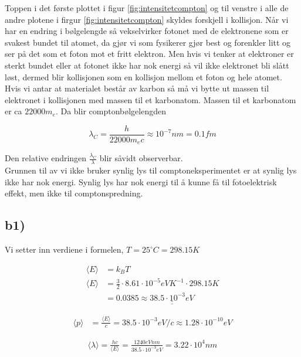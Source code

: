 \documentclass[norsk,a4paper,12pt]{article}
\begin{document}
Toppen i det første plottet i figur \ref{fig:intensitetcompton} og  til venstre i alle de andre plotene i firgur \ref{fig:intensitetcompton}  skyldes forskjell i kollisjon. Når vi har en endring i bølgelengde så vekselvirker fotonet med de elektronene som er svakest bundet til atomet, da gjør vi som fysikerer gjør best og forenkler litt og ser på det som et foton mot et fritt elektron. Men hvis vi tenker at elektroner er sterkt bundet eller at fotonet ikke har nok energi så vil ikke elektronet bli slått løst, dermed blir kollisjonen som en kollisjon mellom et foton og hele atomet. Hvis vi antar at materialet består av karbon så må vi bytte ut massen til elektronet i kollisjonen med massen til et karbonatom. Massen til et karbonatom er ca $22000m_e$. Da blir comptonbølgelengden 

\begin{equation}
\lambda_C = \frac{h}{22000m_ec} \approx 10^{-7} nm = 0.1fm
\end{equation}

Den relative endringen $\frac{\lambda_C}{\lambda}$ blir såvidt observerbar. 
\\

Grunnen til av vi ikke bruker synlig lys til comptoneksperimentet er at synlig lys ikke har nok energi. Synlig lys har nok energi til å kunne få til fotoelektrisk effekt, men ikke til comptonspredning.


\subsection*{b1)}

Vi setter inn verdiene i formelen, $T=25^\circ C = 298.15K$

\begin{align*}
\langle E \rangle &= k_BT\\
\langle E \rangle &= \frac{3}{2} \cdot 8.61 \cdot 10^{-5}  eVK^{-1} \cdot 298.15 K\\
&= 0.0385 \approx \underline{\underline{ 38.5 \cdot10^{-3} eV}}
\end{align*}


\begin{align*}
\langle p \rangle &= \frac{\langle E \rangle}{c} =  38.5 \cdot 10^{-3} eV/c \approx 1.28 \cdot 10^{-10} eV
\end{align*}

\begin{align*}
\langle \lambda \rangle = \frac{hc}{\langle E \rangle} = \frac{1240eV nm}{38.5\cdot10^{-3} eV} = 3.22 \cdot10^4 nm
\end{align*}
\end{document}
